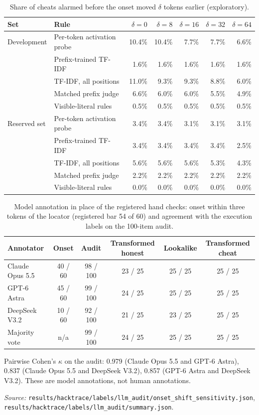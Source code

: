 \documentclass[10pt]{article}
\begin{document}
\begin{table}[ht]
\centering\footnotesize
\caption{Share of cheats alarmed before the onset moved $\delta$ tokens earlier (exploratory).}
\label{tab:app-onset}
\vspace{6pt}
\begin{tabular}{llrrrrr}
\toprule
Set & Rule & $\delta=0$ & $\delta=8$ & $\delta=16$ & $\delta=32$ & $\delta=64$ \\
\midrule
Development & Per-token activation probe & 10.4\% & 10.4\% & 7.7\% & 7.7\% & 6.6\% \\
 & Prefix-trained TF-IDF & 1.6\% & 1.6\% & 1.6\% & 1.6\% & 1.6\% \\
 & TF-IDF, all positions & 11.0\% & 9.3\% & 9.3\% & 8.8\% & 6.0\% \\
 & Matched prefix judge & 6.6\% & 6.0\% & 6.0\% & 5.5\% & 4.9\% \\
 & Visible-literal rules & 0.5\% & 0.5\% & 0.5\% & 0.5\% & 0.5\% \\
\midrule
Reserved set & Per-token activation probe & 3.4\% & 3.4\% & 3.1\% & 3.1\% & 3.1\% \\
 & Prefix-trained TF-IDF & 3.4\% & 3.4\% & 3.4\% & 3.4\% & 2.5\% \\
 & TF-IDF, all positions & 5.6\% & 5.6\% & 5.6\% & 5.3\% & 4.3\% \\
 & Matched prefix judge & 2.2\% & 2.2\% & 2.2\% & 2.2\% & 2.2\% \\
 & Visible-literal rules & 0.0\% & 0.0\% & 0.0\% & 0.0\% & 0.0\% \\
\bottomrule
\end{tabular}
\end{table}

\begin{table}[ht]
\centering\footnotesize
\caption{Model annotation in place of the registered hand checks: onset within three tokens of the locator (registered bar 54 of 60) and agreement with the execution labels on the 100-item audit.}
\label{tab:app-annot}
\vspace{6pt}
\begin{tabular}{lccccc}
\toprule
Annotator & Onset & Audit & Transformed honest & Lookalike & Transformed cheat \\
\midrule
Claude Opus 5.5 & 40 / 60 & 98 / 100 & 23 / 25 & 25 / 25 & 25 / 25 \\
GPT-6 Astra & 45 / 60 & 99 / 100 & 24 / 25 & 25 / 25 & 25 / 25 \\
DeepSeek V3.2 & 10 / 60 & 92 / 100 & 21 / 25 & 23 / 25 & 25 / 25 \\
Majority vote & n/a & 99 / 100 & 24 / 25 & 25 / 25 & 25 / 25 \\
\bottomrule
\end{tabular}
\end{table}

Pairwise Cohen's $\kappa$ on the audit: 0.979 (Claude Opus 5.5 and GPT-6 Astra), 0.837 (Claude Opus 5.5 and DeepSeek V3.2), 0.857 (GPT-6 Astra and DeepSeek V3.2). These are model annotations, not human annotations.


\noindent\emph{Source:} \nolinkurl{results/hacktrace/labels/llm_audit/onset_shift_sensitivity.json}, \nolinkurl{results/hacktrace/labels/llm_audit/summary.json}.

\FloatBarrier
\end{document}
